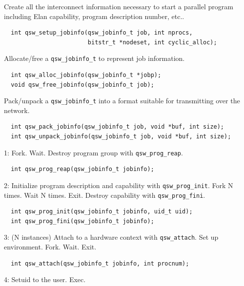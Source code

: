 \documentclass[letter,landscape]{seminar}
\begin{document}
\begin{slide}
  \small
  Create all the interconnect information necessary to start a parallel 
  program including Elan capability, program description number, etc..
  \begin{verbatim}
  int qsw_setup_jobinfo(qsw_jobinfo_t job, int nprocs, 
                        bitstr_t *nodeset, int cyclic_alloc);
  \end{verbatim}
  Allocate/free a {\tt qsw\_jobinfo\_t} to represent job information.
  \begin{verbatim}
  int qsw_alloc_jobinfo(qsw_jobinfo_t *jobp);
  void qsw_free_jobinfo(qsw_jobinfo_t job);
  \end{verbatim}
  Pack/unpack a {\tt qsw\_jobinfo\_t} into a format suitable for transmitting
  over the network.
  \begin{verbatim}
  int qsw_pack_jobinfo(qsw_jobinfo_t job, void *buf, int size);
  int qsw_unpack_jobinfo(qsw_jobinfo_t job, void *buf, int size);
  \end{verbatim}
\end{slide}


\begin{slide}
  \small
  1: Fork.  Wait.  Destroy program group with {\tt qsw\_prog\_reap}.
  \begin{verbatim}
  int qsw_prog_reap(qsw_jobinfo_t jobinfo);
  \end{verbatim}
  2: Initialize program description and capability with {\tt qsw\_prog\_init}.
  Fork N times.  Wait N times.  Exit. Destroy capability with {\tt qsw\_prog\_fini}.
  \begin{verbatim}
  int qsw_prog_init(qsw_jobinfo_t jobinfo, uid_t uid);
  int qsw_prog_fini(qsw_jobinfo_t jobinfo);
  \end{verbatim}
  3: (N instances) Attach to a hardware context with {\tt qsw\_attach}.  
  Set up environment.  Fork.  Wait.  Exit.
  \begin{verbatim}
  int qsw_attach(qsw_jobinfo_t jobinfo, int procnum);
  \end{verbatim}
  4: Setuid to the user.  Exec.
\end{slide}
\end{document}
